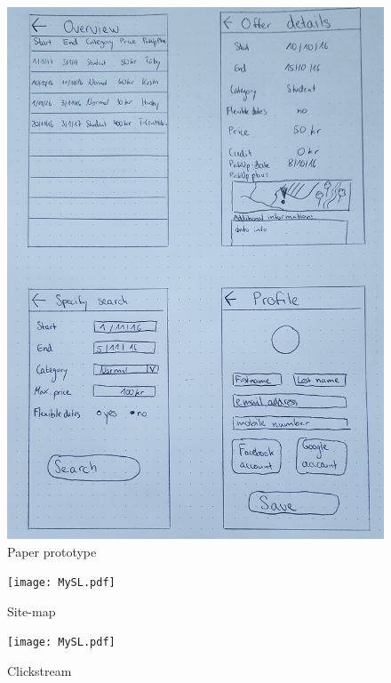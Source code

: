 \documentclass[11pt,twoside,a4paper]{report}
\begin{document}
\begin{appendices}
\begin{figure}
	\centering
	\includegraphics[width=\textwidth]{Paper_prototype2.jpg}
	\caption{Paper prototype}
	\label{figure:paper-prototype-2}
\end{figure}

\begin{figure}
	\centering
	\texttt{[image: MySL.pdf]}
	\caption{Site-map}
	\label{figure:site-map}
\end{figure}

\begin{figure}
	\centering
	\texttt{[image: MySL.pdf]}
	\caption{Clickstream}
	\label{figure:clickstream}
\end{figure}

\end{appendices}
\end{document}
